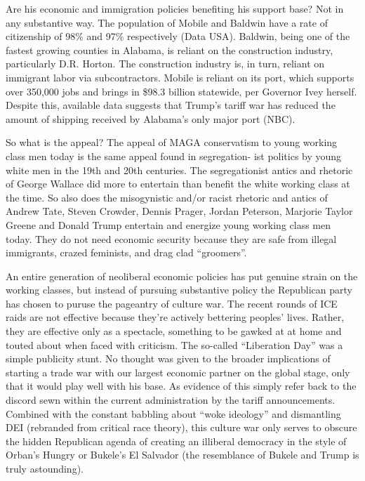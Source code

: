 \documentclass[
]{book}
\begin{document}
Are his economic and immigration policies benefiting his support base? Not in any substantive way. The population of Mobile and Baldwin have a rate of citizenship of 98\% and 97\% respectively (Data USA). Baldwin, being one of the fastest growing counties in Alabama, is reliant on the construction industry, particularly D.R. Horton. The construction industry is, in turn, reliant on immigrant labor via subcontractors. Mobile is reliant on its port, which supports over 350,000 jobs and brings in \$98.3 billion statewide, per Governor Ivey herself. Despite this, available data suggests that Trump's tariff war has reduced the amount of shipping received by Alabama's only major port (NBC).

So what is the appeal? The appeal of MAGA conservatism to young working class men today is the same appeal found in segregation- ist politics by young white men in the 19th and 20th centuries. The segregationist antics and rhetoric of George Wallace did more to entertain than benefit the white working class at the time. So also does the misogynistic and/or racist rhetoric and antics of Andrew Tate, Steven Crowder, Dennis Prager, Jordan Peterson, Marjorie Taylor Greene and Donald Trump entertain and energize young working class men today. They do not need economic security because they are safe from illegal immigrants, crazed feminists, and drag clad ``groomers''.

An entire generation of neoliberal economic policies has put genuine strain on the working classes, but instead of pursuing substantive policy the Republican party has chosen to puruse the pageantry of culture war. The recent rounds of ICE raids are not effective because they're actively bettering peoples' lives. Rather, they are effective only as a spectacle, something to be gawked at at home and touted about when faced with criticism. The so-called ``Liberation Day'' was a simple publicity stunt. No thought was given to the broader implications of starting a trade war with our largest economic partner on the global stage, only that it would play well with his base. As evidence of this simply refer back to the discord sewn within the current administration by the tariff announcements. Combined with the constant babbling about ``woke ideology'' and dismantling DEI (rebranded from critical race theory), this culture war only serves to obscure the hidden Republican agenda of creating an illiberal democracy in the style of Orban's Hungry or Bukele's El Salvador (the resemblance of Bukele and Trump is truly astounding).
\end{document}
